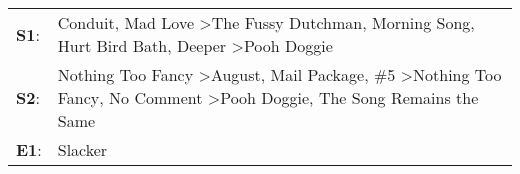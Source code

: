 \begin{supertabular}{p{0.03\textwidth}p{0.92\textwidth}}
 \textbf{S1}:  &                                                                    Conduit\textsuperscript{}, \enspace Mad Love\textsuperscript{} \textgreater \enspace The Fussy Dutchman\textsuperscript{}, \enspace Morning Song\textsuperscript{}, \enspace Hurt Bird Bath\textsuperscript{}, \enspace Deeper\textsuperscript{} \textgreater \enspace Pooh Doggie\textsuperscript{}  \enspace  \\
 \textbf{S2}:  &  Nothing Too Fancy\textsuperscript{} \textgreater \enspace August\textsuperscript{}, \enspace Mail Package\textsuperscript{}, \enspace \#5\textsuperscript{} \textgreater \enspace Nothing Too Fancy\textsuperscript{}, \enspace No Comment\textsuperscript{} \textgreater \enspace Pooh Doggie\textsuperscript{}, \enspace The Song Remains the Same\textsuperscript{}  \enspace  \\
 \textbf{E1}:  &                                                                                                                                                                                                                                                                                                                                               Slacker\textsuperscript{}  \enspace  \\
\end{supertabular}
